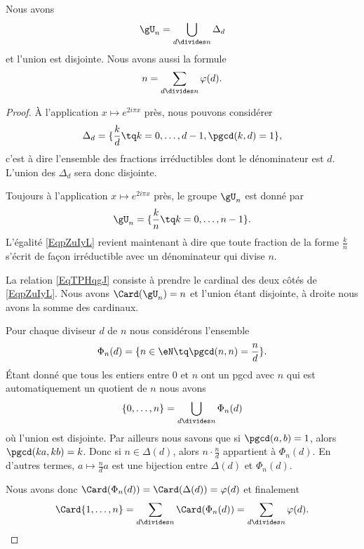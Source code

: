 \begin{lemma}       \label{LemKcpjee}
    Nous avons
    \begin{equation}        \label{EqpZuIyL}
        \gU_n=\bigcup_{d\divides n}\Delta_d
    \end{equation}
    et l'union est disjointe. Nous avons aussi la formule
    \begin{equation}        \label{EqTPHqgJ}
        n=\sum_{d\divides n}\varphi(d).
    \end{equation}
\end{lemma}

\begin{proof}
    À l'application \( x\mapsto  e^{2i\pi x}\) près, nous pouvons considérer
    \begin{equation}
        \Delta_d=\{ \frac{ k }{ d }\tq k=0,\ldots, d-1, \pgcd(k,d)=1 \},
    \end{equation}
    c'est à dire l'ensemble des fractions irréductibles dont le dénominateur est \( d\). L'union des \( \Delta_d\) sera donc disjointe.
    
    Toujours à l'application \( x\mapsto  e^{2i\pi x}\) près, le groupe \( \gU_n\) est donné par
    \begin{equation}
        \gU_n=\{ \frac{ k }{ n }\tq k=0,\ldots, n-1 \}.
    \end{equation}
    L'égalité \eqref{EqpZuIyL} revient maintenant à dire que toute fraction de la forme \( \frac{ k }{ n }\) s'écrit de façon irréductible avec un dénominateur qui divise \( n\).

    La relation \eqref{EqTPHqgJ} consiste à prendre le cardinal des deux côtés de \eqref{EqpZuIyL}. Nous avons \( \Card(\gU_n)=n\) et l'union étant disjointe, à droite nous avons la somme des cardinaux.


    Pour chaque diviseur \( d\) de \( n\) nous considérons l'ensemble
    \begin{equation}
        \Phi_n(d)=\{ n\in \eN\tq \pgcd(n,n)=\frac{ n }{ d } \}.
    \end{equation}
    Étant donné que tous les entiers entre \( 0\) et \( n\) ont un pgcd avec \( n\) qui est automatiquement un quotient de \( n\) nous avons
    \begin{equation}
        \{ 0,\ldots, n \}=\bigcup_{d\divides n}\Phi_n(d)
    \end{equation}
    où l'union est disjointe. Par ailleurs nous savons que si \( \pgcd(a,b)=1\), alors \( \pgcd(ka,kb)=k\). Donc si \( n\in \Delta(d)\), alors \( n\cdot \frac{ n }{ d }\) appartient à \( \Phi_n(d)\). En d'autres termes, \( a\mapsto \frac{ n }{ d }a\) est une bijection entre \( \Delta(d)\) et \( \Phi_n(d)\).

    Nous avons donc \( \Card(\Phi_n(d))=\Card(\Delta(d))=\varphi(d)\) et finalement
    \begin{equation}
        \Card\{ 1,\ldots, n \}=\sum_{d\divides n}\Card(\Phi_n(d))=\sum_{d\divides n}\varphi(d).
    \end{equation}
\end{proof}

